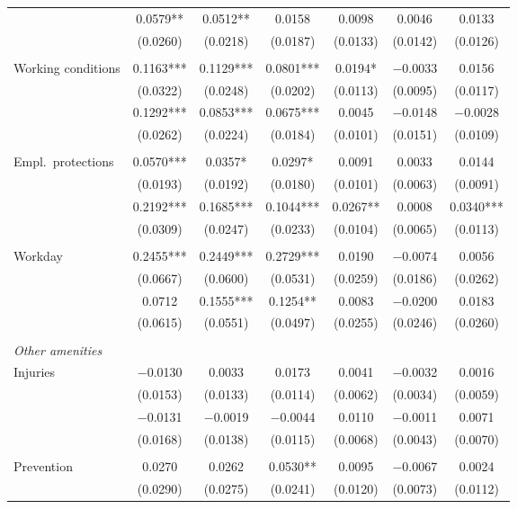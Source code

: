 \documentclass[12pt,letterpaper]{article}
\begin{document}
\begin{longtable}{l cccccc}
  & 0.0579** & 0.0512** & 0.0158 & 0.0098 & 0.0046 & 0.0133 \\
  & (0.0260) & (0.0218) & (0.0187) & (0.0133) & (0.0142) & (0.0126) \\
 & & & & & & \\
\quad Working conditions & 0.1163*** & 0.1129*** & 0.0801*** & 0.0194* & $-$0.0033 & 0.0156 \\
  & (0.0322) & (0.0248) & (0.0202) & (0.0113) & (0.0095) & (0.0117) \\
  & 0.1292*** & 0.0853*** & 0.0675*** & 0.0045 & $-$0.0148 & $-$0.0028 \\
  & (0.0262) & (0.0224) & (0.0184) & (0.0101) & (0.0151) & (0.0109) \\
 & & & & & & \\
\quad Empl.\ protections & 0.0570*** & 0.0357* & 0.0297* & 0.0091 & 0.0033 & 0.0144 \\
  & (0.0193) & (0.0192) & (0.0180) & (0.0101) & (0.0063) & (0.0091) \\
  & 0.2192*** & 0.1685*** & 0.1044*** & 0.0267** & 0.0008 & 0.0340*** \\
  & (0.0309) & (0.0247) & (0.0233) & (0.0104) & (0.0065) & (0.0113) \\
 & & & & & & \\
\quad Workday & 0.2455*** & 0.2449*** & 0.2729*** & 0.0190 & $-$0.0074 & 0.0056 \\
  & (0.0667) & (0.0600) & (0.0531) & (0.0259) & (0.0186) & (0.0262) \\
  & 0.0712 & 0.1555*** & 0.1254** & 0.0083 & $-$0.0200 & 0.0183 \\
  & (0.0615) & (0.0551) & (0.0497) & (0.0255) & (0.0246) & (0.0260) \\
 & & & & & & \\
\midrule
\multicolumn{7}{l}{\textit{Other amenities}} \\
\quad Injuries & $-$0.0130 & 0.0033 & 0.0173 & 0.0041 & $-$0.0032 & 0.0016 \\
  & (0.0153) & (0.0133) & (0.0114) & (0.0062) & (0.0034) & (0.0059) \\
  & $-$0.0131 & $-$0.0019 & $-$0.0044 & 0.0110 & $-$0.0011 & 0.0071 \\
  & (0.0168) & (0.0138) & (0.0115) & (0.0068) & (0.0043) & (0.0070) \\
 & & & & & & \\
\quad Prevention & 0.0270 & 0.0262 & 0.0530** & 0.0095 & $-$0.0067 & 0.0024 \\
  & (0.0290) & (0.0275) & (0.0241) & (0.0120) & (0.0073) & (0.0112) \\

\end{longtable}
\end{document}
